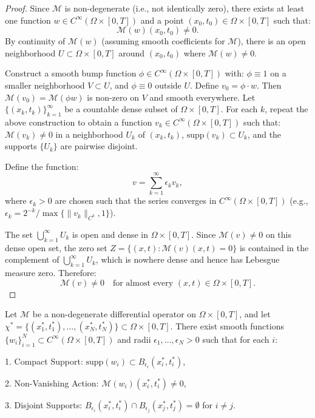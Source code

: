 \begin{proof}
    Since $\mathcal{M}$ is non-degenerate (i.e., not identically zero), there exists at least one function $w \in C^\infty(\Omega \times [0,T])$ and a point $(x_0, t_0) \in \Omega \times [0,T]$ such that:  
   $$
   \mathcal{M}(w)(x_0, t_0) \neq 0.
   $$  
   By continuity of $\mathcal{M}(w)$ (assuming smooth coefficients for $\mathcal{M}$), there is an open neighborhood $U \subset \Omega \times [0,T]$ around $(x_0, t_0)$ where $\mathcal{M}(w) \neq 0$.
   
   Construct a smooth bump function $\phi \in C^\infty(\Omega \times [0,T])$ with:  
   $\phi \equiv 1$ on a smaller neighborhood $V \subset U$,  
   and $\phi \equiv 0$ outside $U$.  
      Define $v_0 = \phi \cdot w$. Then $\mathcal{M}(v_0) = \mathcal{M}(\phi w)$ is non-zero on $V$ and smooth everywhere.  
   Let $\{(x_k, t_k)\}_{k=1}^\infty$ be a countable dense subset of $\Omega \times [0,T]$. For each $k$, repeat the above construction to obtain a function $v_k \in C^\infty(\Omega \times [0,T])$ such that: $\mathcal{M}(v_k) \neq 0$ in a neighborhood $U_k$ of $(x_k, t_k)$,  
   $\text{supp}(v_k) \subset U_k$,  
   and the supports $\{U_k\}$ are pairwise disjoint. 

   Define the function:  
   $$
   v = \sum_{k=1}^\infty \epsilon_k v_k,
   $$  
   where $\epsilon_k > 0$ are chosen such that the series converges in $C^\infty(\Omega \times [0,T])$ (e.g., $\epsilon_k = 2^{-k}/\max\{\|v_k\|_{C^k}, 1\}$).

   The set $\bigcup_{k=1}^\infty U_k$ is open and dense in $\Omega \times [0,T]$. Since $\mathcal{M}(v) \neq 0$ on this dense open set, the zero set $Z = \{(x,t) : \mathcal{M}(v)(x,t) = 0\}$ is contained in the complement of $\bigcup_{k=1}^\infty U_k$, which is nowhere dense and hence has Lebesgue measure zero. Therefore:  
   $$
   \mathcal{M}(v) \neq 0 \quad \text{for almost every } (x,t) \in \Omega \times [0,T].
   $$
\end{proof}

\begin{lemma}\label{lem:B2}
    Let $\mathcal{M}$ be a non-degenerate differential operator on $\Omega \times [0,T]$, and let $\chi^* = \{(x^*_1,t^*_1),\dots,(x^*_N,t^*_N)\} \subset \Omega \times [0,T]$. There exist smooth functions $\{w_i\}_{i=1}^N \subset C^\infty(\Omega \times [0,T])$ and radii $\epsilon_1, \dots, \epsilon_N > 0$ such that for each $i$:  
    
1. Compact Support: $\text{supp}(w_i) \subset B_{\epsilon_i}(x^*_i,t^*_i)$,  

2. Non-Vanishing Action: $\mathcal{M}(w_i)(x^*_i,t^*_i) \neq 0$, 

3. Disjoint Supports: $B_{\epsilon_i}(x^*_i,t^*_i) \cap B_{\epsilon_j}(x^*_j,t^*_j) = \emptyset$ for $i \neq j$. 
\end{lemma} 


